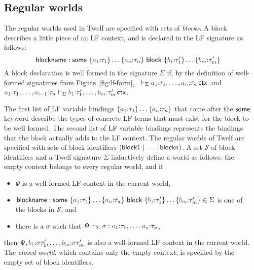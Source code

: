 \subsection{Regular worlds}
\label{sec:gen-regularworlds}

The
regular worlds used in Twelf
\cite{schurmann00automating} are specified with sets of {\it blocks}. A block
describes a little piece of an LF context, and is declared in the LF
signature as follows:
\[
 {\sf blockname} :
 {\sf some}~\{\lf{a_1}{:}\tau_1\}\ldots\{\lf{a_n}{:}\tau_n\}
~{\sf block}~\{\lf{b_1}{:}\tau'_1\}\ldots\{\lf{b_m}{:}\tau'_m\}
\]
A block declaration is well formed in the signature $\Sigma$ if, 
by the definition of well-formed signatures from Figure~\ref{fig:lf-form}, 
$\cdot \vdash_\Sigma \lf{a_1}{:}\tau_1,\ldots,\lf{a_{n}}{:} \tau_{n}\,{\sf ctx}$
and 
$\lf{a_1}{:}\tau_1,\ldots,\lf{a_{i-1}}{:} \tau_{n}
  \vdash_\Sigma \lf{b_1}{:}\tau'_1,\ldots,\lf{b_{m}}{:}\tau'_{m} \,{\sf ctx}$.

The first list of LF variable bindings
$\{\lf{a_1}{:}\tau_1\}\ldots\{\lf{a_n}{:}\tau_n\}$ that 
come after the ${\sf some}$ keyword describe the types
of concrete LF terms that must exist for the block to be well formed.
The second list of LF variable bindings represents the bindings that
the block actually adds to the LF context. The regular worlds of 
Twelf are specified with sets of block identifiers 
$({\sf block1} \mid \ldots \mid {\sf blockn})$. A set 
$\mathcal S$ of block identifiers
and a Twelf signature $\Sigma$ inductively define a world as follows: 
the empty context belongs to every regular world, and if
\smallskip
\begin{itemize}
\item $\Psi$ is a well-formed
LF context in the current world, 
\item ${\sf blockname} :
 {\sf some}~\{\lf{a_1}{:}\tau_1\}\ldots\{\lf{a_n}{:}\tau_n\}
~{\sf block}~\{\lf{b_1}{:}\tau'_1\}\ldots\{\lf{b_m}{:}\tau'_m\} \in \Sigma$
 is one of the blocks in $\mathcal S$, and
\item there is a $\lf{\sigma}$ such that
$\Psi \vdash_\Sigma \lf{\sigma} :
\lf{a_1}{:}\tau_1,\ldots,\lf{a_n}{:}\tau_n$, 
\end{itemize}
\smallskip then $\Psi, \lf{b_1}{:}\lf\sigma\tau'_1,\ldots,
\lf{b_m}{:}\lf\sigma\tau'_m$ is also a well-formed LF context in the
current world. The {\it closed world}, which contains only the empty
context, is specified by the empty set of block identifiers.

